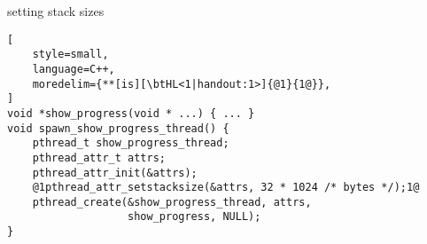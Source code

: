 \begin{frame}[fragile,label=setStackSize]{setting stack sizes}
\begin{lstlisting}[
    style=small,
    language=C++,
    moredelim={**[is][\btHL<1|handout:1>]{@1}{1@}},
]
void *show_progress(void * ...) { ... }
void spawn_show_progress_thread() {
    pthread_t show_progress_thread;
    pthread_attr_t attrs;
    pthread_attr_init(&attrs);
    @1pthread_attr_setstacksize(&attrs, 32 * 1024 /* bytes */);1@
    pthread_create(&show_progress_thread, attrs,
                   show_progress, NULL);
}
\end{lstlisting}
\end{frame}

